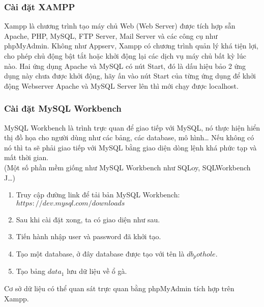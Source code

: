 \subsubsection{Cài đặt XAMPP}
Xampp là chương trình tạo máy chủ Web (Web Server) được tích hợp sẵn Apache, PHP, MySQL, FTP Server, Mail Server và các công cụ như phpMyAdmin. Không như Appserv, Xampp có chương trình quản lý khá tiện lợi, cho phép chủ động bật tắt hoặc khởi động lại các dịch vụ máy chủ bất kỳ lúc nào.
\label{ref{fig4_8}}
Hai ứng dụng Apache và MySQL có nút Start, đó là dấu hiệu bảo 2 ứng dụng này chưa được khởi động, hãy ấn vào nút Start của từng ứng dụng để khởi động Webserver Apache và MySQL Server lên thì mới chạy được localhost.

\subsubsection{Cài đặt MySQL Workbench}
MySQL Workbench là trình trực quan để giao tiếp với MySQL, nó thực hiện hiển thị đồ họa cho người dùng như các bảng, các database, mô hình… Nếu không có nó thì ta sẽ phải giao tiếp với MySQL bằng giao diện dòng lệnh khá phức tạp và mất thời gian.\\
(Một số phần mềm giống như MySQL Workbench như SQLoy, SQLWorkbench J…)\\
\begin{enumerate}
\item Truy cập đường link để tải bản MySQL Workbench: $https://dev.mysql.com/downloads$\\
\label{ref{fig4_9}}
\item Sau khi cài đặt xong, ta có giao diện như sau.
\label{ref{fig4_10}}
\item Tiến hành nhập user và password đã khởi tạo.
\item Tạo một database, ở đây database được tạo với tên là \textbf{$db_pothole$}.
\item Tạo bảng \textbf{$data_1$} lưu dữ liệu về ổ gà.
\end{enumerate}
Cơ sở dữ liệu có thể quan sát trực quan bằng phpMyAdmin tích hợp trên Xampp.
\label{ref{fig4_12}}
\label{ref{fig4_13}}
